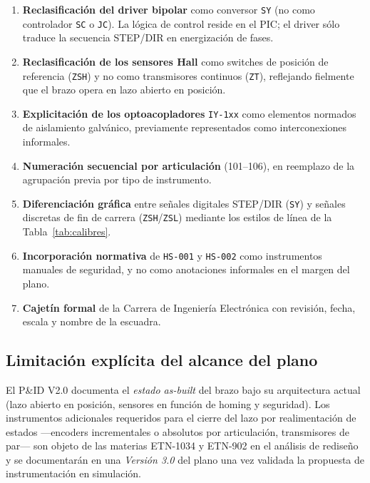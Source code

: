 \documentclass[11pt]{article}
\begin{document}
\begin{enumerate}[leftmargin=1.4em]
	\begin{enumerate}[leftmargin=*]
		\item \textbf{Reclasificación del driver bipolar} como conversor \texttt{SY} (no como controlador \texttt{SC} o \texttt{JC}). La lógica de control reside en el PIC; el driver sólo traduce la secuencia STEP/DIR en energización de fases.
		\item \textbf{Reclasificación de los sensores Hall} como switches de posición de referencia (\texttt{ZSH}) y no como transmisores continuos (\texttt{ZT}), reflejando fielmente que el brazo opera en lazo abierto en posición.
		\item \textbf{Explicitación de los optoacopladores} \texttt{IY-1xx} como elementos normados de aislamiento galvánico, previamente representados como interconexiones informales.
		\item \textbf{Numeración secuencial por articulación} (101–106), en reemplazo de la agrupación previa por tipo de instrumento.
		\item \textbf{Diferenciación gráfica} entre señales digitales STEP/DIR (\texttt{SY}) y señales discretas de fin de carrera (\texttt{ZSH}/\texttt{ZSL}) mediante los estilos de línea de la Tabla~\ref{tab:calibres}.
		\item \textbf{Incorporación normativa} de \texttt{HS-001} y \texttt{HS-002} como instrumentos manuales de seguridad, y no como anotaciones informales en el margen del plano.
		\item \textbf{Cajetín formal} de la Carrera de Ingeniería Electrónica con revisión, fecha, escala y nombre de la escuadra.
	\end{enumerate}
	
	\subsection{Limitación explícita del alcance del plano}
	\label{subsec:limitacion}
	
	El P\&ID V2.0 documenta el \emph{estado as-built} del brazo bajo su arquitectura actual (lazo abierto en posición, sensores en función de homing y seguridad). Los instrumentos adicionales requeridos para el cierre del lazo por realimentación de estados —encoders incrementales o absolutos por articulación, transmisores de par— son objeto de las materias ETN-1034 y ETN-902 en el análisis de rediseño y se documentarán en una \emph{Versión 3.0} del plano una vez validada la propuesta de instrumentación en simulación.
	
	
	

\end{enumerate}
\end{document}
